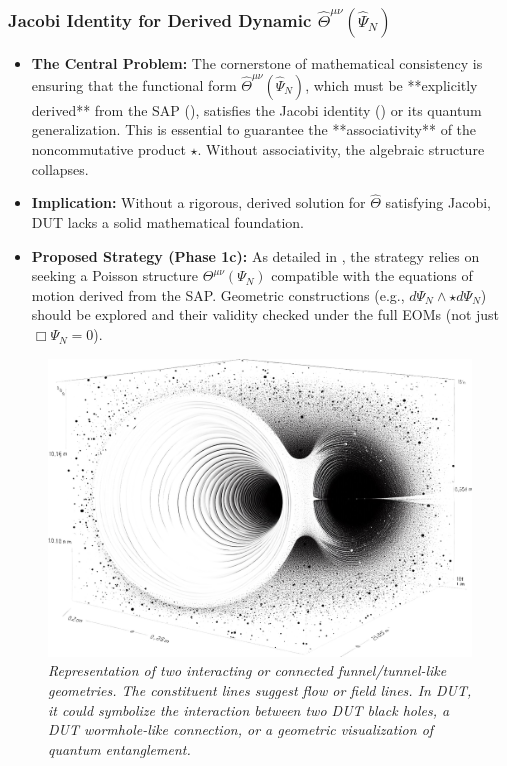 \documentclass[11pt, a4paper]{article}
\theoremstyle{remark}
\newcommand{\Op}[1]{\hat{#1}}
\newcommand{\Star}{\star}
\begin{document}
\subsubsection{Jacobi Identity for Derived Dynamic \texorpdfstring{$\Op{\Theta}^{\mu\nu}(\Op{\Psi}_N)$}{Theta(PsiN)}}
\label{ssubsec:jacobi_problem_statement_detailed}
\begin{itemize}
    \item \textbf{The Central Problem:} The cornerstone of mathematical consistency is ensuring that the functional form \( \Op{\Theta}^{\mu\nu}(\Op{\Psi}_N) \), which must be **explicitly derived** from the SAP (), satisfies the Jacobi identity () or its quantum generalization. This is essential to guarantee the **associativity** of the noncommutative product \( \Star \). Without associativity, the algebraic structure collapses.
    \item \textbf{Implication:} Without a rigorous, derived solution for \( \Op{\Theta} \) satisfying Jacobi, DUT lacks a solid mathematical foundation.
    \item \textbf{Proposed Strategy (Phase 1c):} As detailed in , the strategy relies on seeking a Poisson structure \( \Theta^{\mu\nu}(\Psi_N) \) compatible with the equations of motion derived from the SAP. Geometric constructions (e.g., \( d\Psi_N \wedge \star d\Psi_N \)) should be explored and their validity checked under the full EOMs (not just \( \Box \Psi_N = 0 \)).
\end{itemize}

\begin{figure}[htbp]
    \centering
    \includegraphics[width=0.6\linewidth]{OIG28.ZNLJ.PNG}
    \caption{%
     \footnotesize\textit{Representation of two interacting or connected funnel/tunnel-like geometries. The constituent lines suggest flow or field lines. In DUT, it could symbolize the interaction between two DUT black holes, a DUT wormhole-like connection, or a geometric visualization of quantum entanglement.}
    }
    \label{fig:Figura17}
\end{figure}
\end{document}
